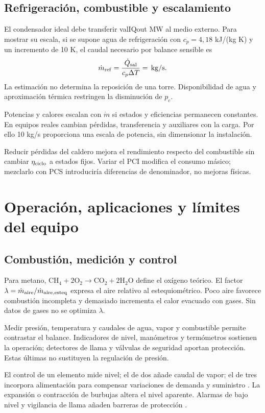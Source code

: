 \documentclass[conference,a4paper,11pt]{IEEEtran}
\newcommand{\V}[1]{\csname val#1\endcsname}
\begin{document}
\subsection{Refrigeración, combustible y escalamiento}
El condensador ideal debe transferir \V{IQout} MW al medio externo. Para mostrar su escala, si se supone agua de refrigeración con $c_p=4,18$ kJ/(kg K) y un incremento de 10 K, el caudal necesario por balance sensible es
\begin{equation}
\dot m_{\rm ref}=\frac{\dot Q_{\rm sal}}{c_p\Delta T}
=\V{Ecoolwater}\,\mathrm{kg/s}.
\label{eq:ref}
\end{equation}
La estimación no determina la reposición de una torre. Disponibilidad de agua y aproximación térmica restringen la disminución de $p_c$.

Potencias y calores escalan con $\dot m$ si estados y eficiencias permanecen constantes. En equipos reales cambian pérdidas, transferencia y auxiliares con la carga. Por ello 10 kg/s proporciona una escala de potencia, sin dimensionar la instalación.

Reducir pérdidas del caldero mejora el rendimiento respecto del combustible sin cambiar $\eta_{\rm ciclo}$ a estados fijos. Variar el PCI modifica el consumo másico; mezclarlo con PCS introduciría diferencias de denominador, no mejoras físicas.

\section{Operación, aplicaciones y límites del equipo}
\subsection{Combustión, medición y control}
Para metano, $\mathrm{CH_4+2O_2\to CO_2+2H_2O}$ define el oxígeno teórico. El factor $\lambda=\dot m_{\rm aire}/\dot m_{\rm aire,esteq}$ expresa el aire relativo al estequiométrico. Poco aire favorece combustión incompleta y demasiado incrementa el calor evacuado con gases. Sin datos de gases no se optimiza $\lambda$.

Medir presión, temperatura y caudales de agua, vapor y combustible permite contrastar el balance. Indicadores de nivel, manómetros y termómetros sostienen la operación; detectores de llama y válvulas de seguridad aportan protección. Estas últimas no sustituyen la regulación de presión.

El control de un elemento mide nivel; el de dos añade caudal de vapor; el de tres incorpora alimentación para compensar variaciones de demanda y suministro \cite{spirax_control}. La expansión o contracción de burbujas altera el nivel aparente. Alarmas de bajo nivel y vigilancia de llama añaden barreras de protección \cite{spirax_nivel}.
\end{document}
